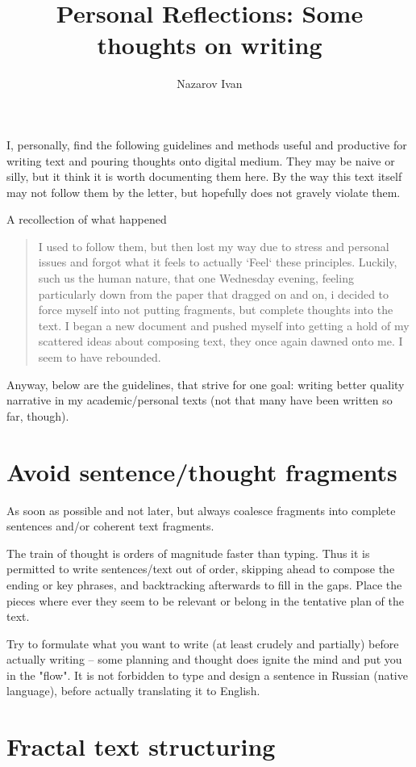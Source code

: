 \documentclass[10pt,a4paper,twocolumn]{article}
\title{Personal Reflections: Some thoughts on writing}
\author{Nazarov Ivan}
\begin{document}
I, personally, find the following guidelines and methods useful and productive for
writing text and pouring thoughts onto digital medium. They may be naive or silly,
but it think it is worth documenting them here. By the way this text itself may not
follow them by the letter, but hopefully does not gravely violate them.


A recollection of what happened
\begin{quote}
I used to follow them, but then lost my way due to stress and personal issues and
forgot what it feels to actually `Feel` these principles. Luckily, such us the human
nature, that one Wednesday evening, feeling particularly down from the paper that
dragged on and on, i decided to force myself into not putting fragments, but complete
thoughts into the text. I began a new document and pushed myself into getting a hold
of my scattered ideas about composing text, they once again dawned onto me. I seem to
have rebounded.
\end{quote}

Anyway, below are the guidelines, that strive for one goal: writing better quality
narrative in my academic/personal texts (not that many have been written so far, though).


\section{Avoid sentence/thought fragments} %
\label{sec:avoid_sentence_thought_fragments}

As soon as possible and not later, but always coalesce fragments into complete sentences
and/or coherent text fragments.

The train of thought is orders of magnitude faster than typing. Thus it is permitted
to write sentences/text out of order, skipping ahead to compose the ending or key phrases,
and backtracking afterwards to fill in the gaps. Place the pieces where ever they seem
to be relevant or belong in the tentative plan of the text.

Try to formulate what you want to write (at least crudely and partially) before actually
writing -- some planning and thought does ignite the mind and put you in the "flow".
It is not forbidden to type and design a sentence in Russian (native language), before
actually translating it to English.


\section{Fractal text structuring} %
\label{sec:fractal_text_structuring}
\end{document}
